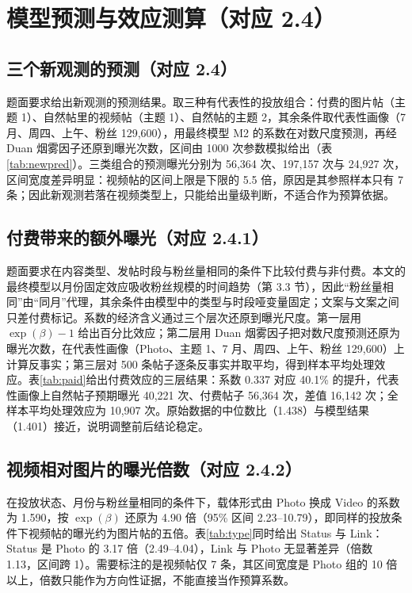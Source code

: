 \section{模型预测与效应测算（对应 2.4）}

\subsection{三个新观测的预测（对应 2.4）}

题面要求给出新观测的预测结果。取三种有代表性的投放组合：付费的图片帖（主题 1）、自然帖里的视频帖（主题 1）、自然帖的主题 2，其余条件取代表性画像（7 月、周四、上午、粉丝 129,600），用最终模型 M2 的系数在对数尺度预测，再经 Duan 烟雾因子还原到曝光次数，区间由 1000 次参数模拟给出（表\ref{tab:newpred}）。三类组合的预测曝光分别为 56,364 次、197,157 次与 24,927 次，区间宽度差异明显：视频帖的区间上限是下限的 5.5 倍，原因是其参照样本只有 7 条；因此新观测若落在视频类型上，只能给出量级判断，不适合作为预算依据。



\subsection{付费带来的额外曝光（对应 2.4.1）}

题面要求在内容类型、发帖时段与粉丝量相同的条件下比较付费与非付费。本文的最终模型以月份固定效应吸收粉丝规模的时间趋势（第 3.3 节），因此“粉丝量相同”由“同月”代理，其余条件由模型中的类型与时段哑变量固定；文案与文案之间只差付费标记。系数的经济含义通过三个层次还原到曝光尺度。第一层用 $\exp(\beta)-1$ 给出百分比效应；第二层用 Duan 烟雾因子把对数尺度预测还原为曝光次数，在代表性画像（Photo、主题 1、7 月、周四、上午、粉丝 129,600）上计算反事实；第三层对 500 条帖子逐条反事实并取平均，得到样本平均处理效应。表\ref{tab:paid}给出付费效应的三层结果：系数 0.337 对应 40.1\% 的提升，代表性画像上自然帖子预期曝光 40,221 次、付费帖子 56,364 次，差值 16,142 次；全样本平均处理效应为 10,907 次。原始数据的中位数比（1.438）与模型结果（1.401）接近，说明调整前后结论稳定。



\subsection{视频相对图片的曝光倍数（对应 2.4.2）}

在投放状态、月份与粉丝量相同的条件下，载体形式由 Photo 换成 Video 的系数为 1.590，按 $\exp(\beta)$ 还原为 4.90 倍（95\% 区间 2.23--10.79），即同样的投放条件下视频帖的曝光约为图片帖的五倍。表\ref{tab:type}同时给出 Status 与 Link：Status 是 Photo 的 3.17 倍（2.49--4.04），Link 与 Photo 无显著差异（倍数 1.13，区间跨 1）。需要标注的是视频帖仅 7 条，其区间宽度是 Photo 组的 10 倍以上，倍数只能作为方向性证据，不能直接当作预算系数。

